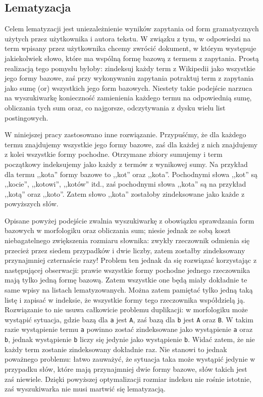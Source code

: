 \documentclass[a4paper,12pt]{article}
\begin{document}
\subsection{Lematyzacja}
Celem lematyzacji jest uniezależnienie wyników zapytania od form gramatycznych
użytych przez użytkownika i autora tekstu. W związku z tym, w odpowiedzi na term
wpisany przez użytkownika chcemy zwrócić dokument, w którym występuje
jakiekolwiek słowo, które ma wspólną formę bazową z termem z zapytania. Prostą
realizacją tego pomysłu byłoby: zindeksuj każdy term z Wikipedii jako wszystkie
jego formy bazowe, zaś przy wykonywaniu zapytania potraktuj term z zapytania
jako sumę (or) wszystkich jego form bazowych. Niestety takie podejście narzuca
na wyszukiwarkę konieczność zamienienia każdego termu na odpowiednią sumę,
obliczania tych sum oraz, co najgorsze, odczytywania z dysku wielu list
postingowych.

W niniejszej pracy zastosowano inne rozwiązanie. Przypuśćmy, że dla każdego
termu znajdujemy wszystkie jego formy bazowe, zaś dla każdej z nich znajdujemy
z kolei wszystkie formy pochodne. Otrzymane zbiory sumujemy i term początkowy
indeksujemy jako każdy z termów z wynikowej sumy. Na przykład dla termu
,,kota'' formy bazowe to ,,kot'' oraz ,,kota''. Pochodnymi słowa ,,kot'' są
,,kocie'', ,,kotowi'', ,,kotów'' itd., zaś pochodnymi słowa ,,kota'' są
na przykład ,,kotą'' oraz ,,koto''. Zatem słowo ,,kota'' zostałoby zindeksowane
jako każde z powyższych słów.

Opisane powyżej podejście zwalnia wyszukiwarkę z obowiązku sprawdzania form
bazowych w morfologiku oraz obliczania sum; niesie jednak ze sobą koszt
niebagatelnego zwiększenia rozmiaru słownika: zwykły rzeczownik odmienia się
przecież przez siedem przypadków i dwie liczby, zatem zostałby zindeksowany
przynajmniej czternaście razy! Problem ten jednak da się rozwiązać korzystając
z następującej obserwacji: prawie wszystkie formy pochodne jednego rzeczownika
mają tylko jedną formę bazową. Zatem wszystkie one będą miały dokładnie te same
wpisy na listach lematyzowanych. Można zatem pamiętać tylko jedną taką listę
i zapisać w indeksie, że wszystkie formy tego rzeczownika współdzielą ją.
Rozwiązanie to nie usuwa całkowicie problemu duplikacji: w morfologiku może
wystąpić sytuacja, gdzie bazą dla \texttt{a} jest \texttt{A}, zaś bazą dla
\texttt{b} jest \texttt{A} oraz \texttt{B}. W takim razie wystąpienie termu
\texttt{a} powinno zostać zindeksowane jako wystąpienie \texttt{a} oraz
\texttt{b}, jednak wystąpienie \texttt{b} liczy się jedynie jako wystąpienie
\texttt{b}. Widać zatem, że nie każdy term zostanie zindeksowany dokładnie raz.
Nie stanowi to jednak poważnego problemu: łatwo zauważyć, że sytuacja taka może
wystąpić jedynie w przypadku słów, które mają przynajmniej dwie formy bazowe,
słów takich jest zaś niewiele. Dzięki powyższej optymalizacji rozmiar indeksu
nie rośnie istotnie, zaś wyszukiwarka nie musi martwić się lematyzacją.
\end{document}
